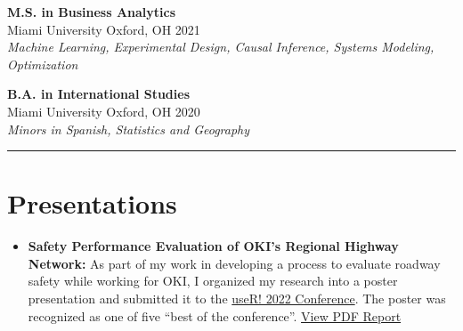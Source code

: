 \documentclass[
  11pt,
]{article}
\providecommand{\tightlist}{%
  \setlength{\itemsep}{0pt}\setlength{\parskip}{0pt}}\usepackage{longtable,booktabs,array}
\begin{document}
\textbf{M.S. in Business Analytics}\\
Miami University \textbar{} Oxford, OH \textbar{} 2021\\
\emph{Machine Learning, Experimental Design, Causal Inference, Systems
Modeling, Optimization}

\textbf{B.A. in International Studies}\\
Miami University \textbar{} Oxford, OH \textbar{} 2020\\
\emph{Minors in Spanish, Statistics and Geography}

\begin{center}\rule{0.5\linewidth}{0.5pt}\end{center}

\hypertarget{presentations}{%
\section{Presentations}\label{presentations}}

\begin{itemize}
\tightlist
\item
  \textbf{Safety Performance Evaluation of OKI's Regional Highway
  Network:} As part of my work in developing a process to evaluate
  roadway safety while working for OKI, I organized my research into a
  poster presentation and submitted it to the
  \href{https://user2022.r-project.org/program/posters/}{useR! 2022
  Conference}. The poster was recognized as one of five ``best of the
  conference''.
  \href{/assets/pdfs/Roadway\%20Safety\%20Poster\%20V2.pdf}{View PDF
  Report}
\end{itemize}
\end{document}
